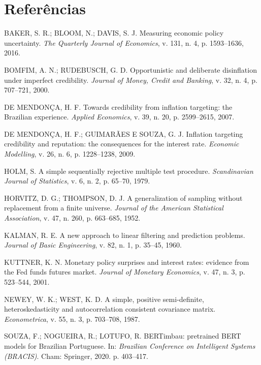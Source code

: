 \documentclass[11pt,a4paper]{article}
\begin{document}
\section*{Referências}
{\small
\begin{list}{}{\setlength{\leftmargin}{1.5em}\setlength{\itemindent}{-1.5em}\setlength{\itemsep}{0.3em}}
\item BAKER, S. R.; BLOOM, N.; DAVIS, S. J. Measuring economic policy uncertainty. \emph{The Quarterly Journal of Economics}, v. 131, n. 4, p. 1593--1636, 2016.
\item BOMFIM, A. N.; RUDEBUSCH, G. D. Opportunistic and deliberate disinflation under imperfect credibility. \emph{Journal of Money, Credit and Banking}, v. 32, n. 4, p. 707--721, 2000.
\item DE MENDONÇA, H. F. Towards credibility from inflation targeting: the Brazilian experience. \emph{Applied Economics}, v. 39, n. 20, p. 2599--2615, 2007.
\item DE MENDONÇA, H. F.; GUIMARÃES E SOUZA, G. J. Inflation targeting credibility and reputation: the consequences for the interest rate. \emph{Economic Modelling}, v. 26, n. 6, p. 1228--1238, 2009.
\item HOLM, S. A simple sequentially rejective multiple test procedure. \emph{Scandinavian Journal of Statistics}, v. 6, n. 2, p. 65--70, 1979.
\item HORVITZ, D. G.; THOMPSON, D. J. A generalization of sampling without replacement from a finite universe. \emph{Journal of the American Statistical Association}, v. 47, n. 260, p. 663--685, 1952.
\item KALMAN, R. E. A new approach to linear filtering and prediction problems. \emph{Journal of Basic Engineering}, v. 82, n. 1, p. 35--45, 1960.
\item KUTTNER, K. N. Monetary policy surprises and interest rates: evidence from the Fed funds futures market. \emph{Journal of Monetary Economics}, v. 47, n. 3, p. 523--544, 2001.
\item NEWEY, W. K.; WEST, K. D. A simple, positive semi-definite, heteroskedasticity and autocorrelation consistent covariance matrix. \emph{Econometrica}, v. 55, n. 3, p. 703--708, 1987.
\item SOUZA, F.; NOGUEIRA, R.; LOTUFO, R. BERTimbau: pretrained BERT models for Brazilian Portuguese. In: \emph{Brazilian Conference on Intelligent Systems (BRACIS)}. Cham: Springer, 2020. p. 403--417.
\end{list}
}
\end{document}
